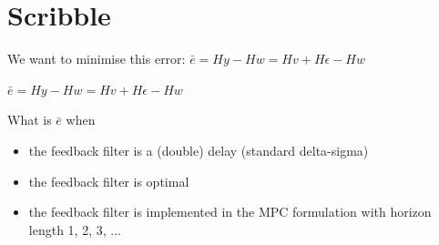 \documentclass[a4paper]{article}
\begin{document}

\newpage

 

\section{Scribble}

We want to minimise this error: $\bar{e} = H y - H w = H v + H \epsilon - H w$

$\bar{e} = H y - H w = H v + H \epsilon - H w$

What is $\bar{e}$ when
\begin{itemize}
    \item the feedback filter is a (double) delay (standard delta-sigma)
    \item the feedback filter is optimal
    \item the feedback filter is implemented in the MPC formulation with horizon length 1, 2, 3, ...
\end{itemize}
\end{document}
